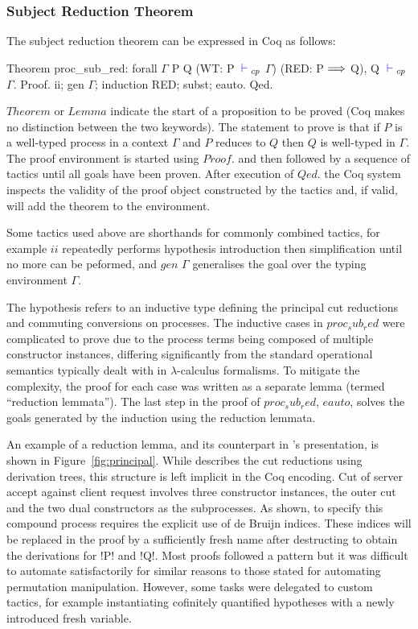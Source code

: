 \subsubsection{Subject Reduction Theorem}

The subject reduction theorem can be expressed in Coq as follows:
\begin{coq}
Theorem proc_sub_red:
  forall $\Gamma$ P Q
         (WT: P ${\color{blue} {} \vdash {}}_{cp}$ $\Gamma$)
         (RED: P $\Longrightarrow$ Q),
    Q ${\color{blue} {} \vdash {}}_{cp}$ $\Gamma$.
Proof. ii; gen $\Gamma$; induction RED; subst; eauto. Qed.
\end{coq}

\coqe$Theorem$ or \coqe$Lemma$ indicate the start of a proposition to be
proved (Coq makes no distinction between the two keywords). The statement to
prove is that if \coqe$P$ is a well-typed process in a context $\Gamma$ and
\coqe$P$ reduces to \coqe$Q$ then \coqe$Q$ is well-typed in $\Gamma$. The
proof environment is started using \coqe$Proof.$ and then followed by a
sequence of tactics until all goals have been proven. After execution of
\coqe$Qed.$ the Coq system inspects the validity of the proof object
constructed by the tactics and, if valid, will add the theorem to the
environment.

Some tactics used above are shorthands for commonly combined tactics, for
example \coqe$ii$ repeatedly performs hypothesis introduction then
simplification until no more can be peformed, and \coqe$gen$ $\Gamma$
generalises the goal over the typing environment $\Gamma$.



The  hypothesis refers to an inductive type defining the principal
cut reductions and commuting conversions on processes. The inductive cases in
\coqe$proc_sub_red$ were complicated to prove due to the process terms being
composed of multiple constructor instances, differing significantly from the
standard operational semantics typically dealt with in $\lambda$-calculus
formalisms. To mitigate the complexity, the proof for each case was written as
a separate lemma (termed ``reduction lemmata''). The last step in the proof of
\coqe$proc_sub_red$, \coqe$eauto$, solves the goals generated by the induction
using the reduction lemmata.

An example of a reduction lemma, and its counterpart in
\citeauthor{Wadler:2014}'s presentation, is shown in
Figure~\ref{fig:principal}. While \citeauthor{Wadler:2014} describes the cut
reductions using derivation trees, this structure is left implicit in the Coq
encoding. Cut of server accept against client request involves three
constructor instances, the outer cut and the two dual constructors as the
subprocesses. As shown, to specify this compound process requires the explicit
use of de Bruijn indices. These indices will be replaced in the proof by a
sufficiently fresh name after destructing  to obtain the derivations
for \coqe!P! and \coqe!Q!. Most proofs followed a pattern but it was difficult
to automate satisfactorily for similar reasons to those stated for automating
permutation manipulation. However, some tasks were delegated to custom
tactics, for example instantiating cofinitely quantified hypotheses with a
newly introduced fresh variable.

